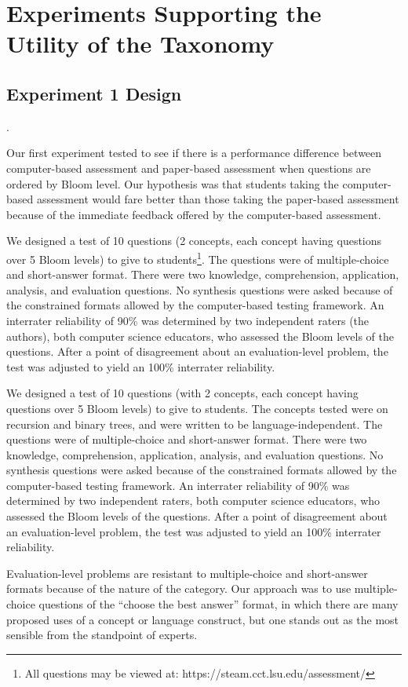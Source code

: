 \section{Experiments Supporting the Utility of the Taxonomy}
\label{sec:experiments}

\subsection{Experiment 1 Design}. 

Our first experiment tested to see if there is a performance difference between
computer-based assessment and paper-based assessment when questions are ordered
by Bloom level.  Our hypothesis was that students taking the computer-based
assessment would fare better than those taking the paper-based assessment
because of the immediate feedback offered by the computer-based assessment.

We designed a test of 10 questions (2 concepts, each concept having questions
over 5 Bloom levels) to give to students\footnote{All questions may be viewed
at: https://steam.cct.lsu.edu/assessment/}. The questions were of
multiple-choice and short-answer format.  There were two knowledge,
comprehension, application, analysis, and evaluation questions.  No synthesis
questions were asked because of the constrained formats allowed by the
computer-based testing framework.  An interrater reliability of 90\% was
determined by two independent raters (the authors), both computer science
educators, who assessed the Bloom levels of the questions.  After a point of
disagreement about an evaluation-level problem, the test was adjusted to yield
an 100\% interrater reliability.

We designed a test of 10 questions (with 2 concepts, each concept having
questions over 5 Bloom levels) to give to students. The concepts tested were on
recursion and binary trees, and were written to be language-independent.  The
questions were of multiple-choice and short-answer format.  There were two
knowledge, comprehension, application, analysis, and evaluation questions.  No
synthesis questions were asked because of the constrained formats allowed by
the computer-based testing framework.  An interrater reliability of 90\% was
determined by two independent raters, both computer science educators, who
assessed the Bloom levels of the questions.  After a point of disagreement
about an evaluation-level problem, the test was adjusted to yield an 100\%
interrater reliability.

Evaluation-level problems are resistant to multiple-choice and short-answer
formats because of the nature of the category.  Our approach was to use
multiple-choice questions of the ``choose the best answer'' format, in which
there are many proposed uses of a concept or language construct, but one stands
out as the most sensible from the standpoint of experts. 

